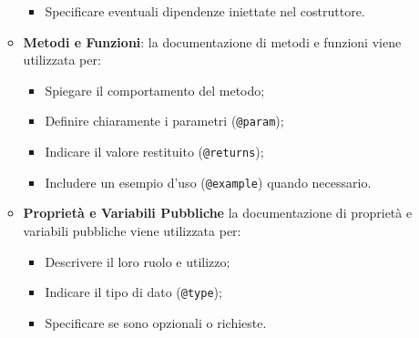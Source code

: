 \begin{itemize}
\begin{itemize}
\begin{itemize}
            \item Specificare eventuali dipendenze iniettate nel costruttore.
        \end{itemize}
        \item \textbf{Metodi e Funzioni}: la documentazione di metodi e funzioni viene utilizzata per:
        \begin{itemize}
            \item Spiegare il comportamento del metodo;
            \item Definire chiaramente i parametri (\texttt{@param});
            \item Indicare il valore restituito (\texttt{@returns});
            \item Includere un esempio d'uso (\texttt{@example}) quando necessario.
        \end{itemize}
        \item \textbf{Proprietà e Variabili Pubbliche} la documentazione di proprietà e variabili pubbliche viene utilizzata per:
        \begin{itemize}
            \item Descrivere il loro ruolo e utilizzo;
            \item Indicare il tipo di dato (\texttt{@type});
            \item Specificare se sono opzionali o richieste.
        \end{itemize}
    \end{itemize}
\end{itemize}

